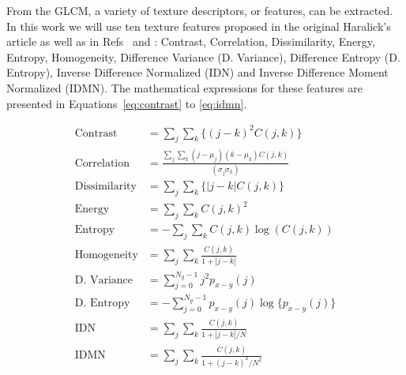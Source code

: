 From the GLCM, a variety of texture descriptors, or features, can be extracted. In this work we will use ten texture features proposed in the original Haralick's article\cite{Haralick73} as well as in Refs~\cite{soh1999texture} and \cite{clausi2002analysis}: Contrast\cite{Haralick73}, Correlation\cite{Haralick73}, Dissimilarity\cite{soh1999texture}, Energy\cite{Haralick73}, Entropy\cite{soh1999texture}, Homogeneity\cite{Haralick73}, Difference Variance\cite{Haralick73} (D. Variance), Difference Entropy\cite{Haralick73} (D. Entropy), Inverse Difference Normalized\cite{clausi2002analysis} (IDN) and Inverse Difference Moment Normalized\cite{clausi2002analysis} (IDMN). The mathematical expressions for these features are presented in Equations~\ref{eq:contrast} to \ref{eq:idmn}.

\begin{align}\label{eq:contrast}
\text{Contrast} &= \textstyle\sum_j\sum_k\{(j-k)^2C(j,k)\}\\
\text{Correlation} &= \textstyle\frac{\sum_j\sum_k(j-\mu_j)(k-\mu_k)C(j,k)}{(\sigma_j\sigma_k)}\\ %
\text{Dissimilarity} & = \textstyle\sum_j\sum_k\{|j-k|C(j,k)\}\\
\text{Energy} &= \textstyle\sum_j\sum_k C(j,k)^2\\
\text{Entropy} &= - \textstyle\sum_j\sum_kC(j,k)\log(C(j,k))\\
\text{Homogeneity} &= \textstyle\sum_j\sum_k \frac{C(j,k)}{1+|j-k|}\\ %
\text{D. Variance} &= \textstyle\sum_{j=0}^{N_g-1}j^2 p_{x-y}(j)\\
\text{D. Entropy} &= -\textstyle\sum_{j=0}^{N_g-1} p_{x-y}(j)\log\{p_{x-y}(j)\}\\
\text{IDN} &= \textstyle\sum_j\sum_k \frac{C(j,k)}{1+|j-k|/N}\\ \label{eq:idmn}
\text{IDMN} &= \textstyle\sum_j\sum_k \frac{C(j,k)}{1+(j-k)^2/N^2}
\end{align}


